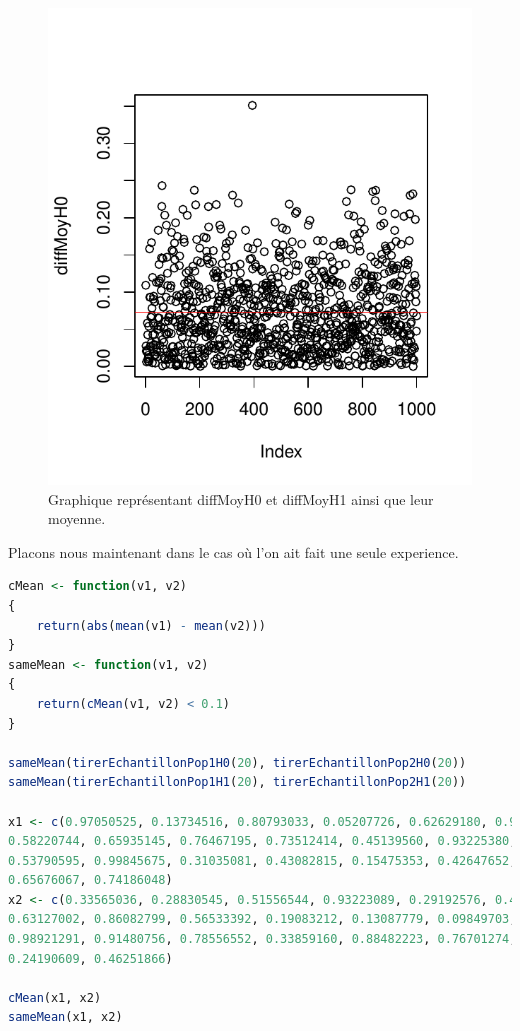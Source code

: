 \begin{figure}[htbp]
	\begin{center}
		\includegraphics[width=12cm]{diagrams/diffMoy.pdf}
		\caption{Graphique représentant diffMoyH0 et diffMoyH1 ainsi que leur moyenne.}
		\label{fig:diffMoy}
	\end{center}
\end{figure}


Placons nous maintenant dans le cas où l'on ait fait une seule experience.


\begin{lstlisting}[language=R]
cMean <- function(v1, v2)
{
	return(abs(mean(v1) - mean(v2)))
}
sameMean <- function(v1, v2)
{
	return(cMean(v1, v2) < 0.1)
}

sameMean(tirerEchantillonPop1H0(20), tirerEchantillonPop2H0(20))
sameMean(tirerEchantillonPop1H1(20), tirerEchantillonPop2H1(20))

x1 <- c(0.97050525, 0.13734516, 0.80793033, 0.05207726, 0.62629180, 0.93485856,
0.58220744, 0.65935145, 0.76467195, 0.73512414, 0.45139560, 0.93225380,
0.53790595, 0.99845675, 0.31035081, 0.43082815, 0.15475353, 0.42647652,
0.65676067, 0.74186048)
x2 <- c(0.33565036, 0.28830545, 0.51556544, 0.93223089, 0.29192576, 0.43505823,
0.63127002, 0.86082799, 0.56533392, 0.19083212, 0.13087779, 0.09849703,
0.98921291, 0.91480756, 0.78556552, 0.33859160, 0.88482223, 0.76701274,
0.24190609, 0.46251866)

cMean(x1, x2)
sameMean(x1, x2)
\end{lstlisting}

